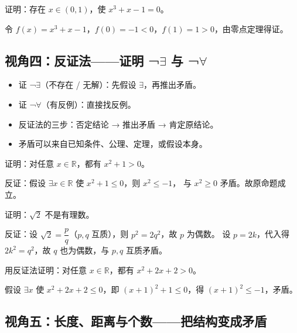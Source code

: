 \begin{explore}
\begin{problem}
证明：存在 $x\in(0,1)$，使 $x^3+x-1=0$。
\end{problem}
\begin{solution}
令 $f(x)=x^3+x-1$，$f(0)=-1<0$，$f(1)=1>0$，由零点定理得证。
\end{solution}

\subsection{视角四：反证法——证明 ¬$\exists$ 与 ¬$\forall$}

  \begin{itemize}
  \item 证 ¬$\exists$（不存在 / 无解）：先假设 $\exists$，再推出矛盾。
  \item 证 ¬$\forall$（有反例）：直接找反例。
  \item 反证法的三步：否定结论 → 推出矛盾 → 肯定原结论。
  \item 矛盾可以来自已知条件、公理、定理，或假设本身。
\end{itemize}

\begin{example}
证明：对任意 $x\in\mathbb{R}$，都有 $x^2+1>0$。
\end{example}
\begin{solution}
反证：假设 $\exists x\in\mathbb{R}$ 使 $x^2+1\leq0$，则 $x^2\leq-1$，
与 $x^2\geq0$ 矛盾。故原命题成立。
\end{solution}

\begin{example}
证明：$\sqrt2$ 不是有理数。
\end{example}
\begin{solution}
反证：设 $\sqrt2=\dfrac pq$（$p,q$ 互质），则 $p^2=2q^2$，故 $p$ 为偶数。
设 $p=2k$，代入得 $2k^2=q^2$，故 $q$ 也为偶数，与 $p,q$ 互质矛盾。
\end{solution}

\begin{problem}
用反证法证明：对任意 $x\in\mathbb{R}$，都有 $x^2+2x+2>0$。
\end{problem}
\begin{solution}
假设 $\exists x$ 使 $x^2+2x+2\leq0$，即 $(x+1)^2+1\leq0$，得 $(x+1)^2\leq-1$，矛盾。
\end{solution}

\subsection{视角五：长度、距离与个数——把结构变成矛盾}


\end{explore}
